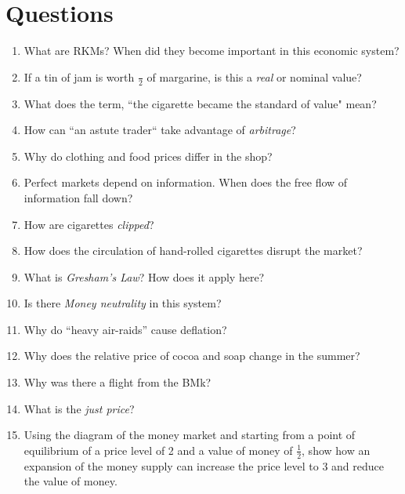 \documentclass{article}
\begin{document}
\section{Questions}
\begin{enumerate}
\item What are RKMs? When did they become important in this economic system? 

\item If a tin of jam is worth $\frac{}{2}$ of margarine, is this a \emph{real} or {nominal} value? 

\item What does the term, ``the cigarette became the standard of value" mean? 

\item How can ``an astute trader`` take advantage of \emph{arbitrage}? 

\item Why do clothing and food prices differ in the shop? 

\item Perfect markets depend on information. When does the free flow of information fall down? 

\item How are cigarettes \emph{clipped}?

\item How does the circulation of hand-rolled cigarettes disrupt the market? 

\item What is \emph{Gresham's Law}?  How does it apply here? 

\item Is there \emph{Money neutrality} in this system? 

\item Why do ``heavy air-raids'' cause deflation? 

\item Why does the relative price of cocoa and soap change in the summer? 

\item Why was there a flight from the BMk?

\item What is the \emph{just price}?

\item Using the diagram of the money market and starting from a point of equilibrium of a price level of 2 and a value of money of $\frac{1}{2}$, show how an expansion of the money supply can increase the price level to 3 and reduce the value of money. 


\end{enumerate}
\end{document}
